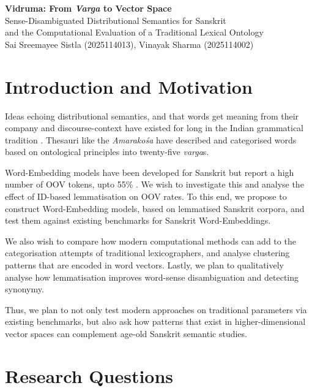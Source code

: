 \documentclass[11pt,a4paper]{article}
\begin{document}
\begin{center}
{\large\bfseries Vidruma: From \textit{Varga} to Vector Space}\\[2pt]
{\normalsize Sense-Disambiguated Distributional Semantics for Sanskrit\\ and the Computational Evaluation of a Traditional Lexical Ontology}\\[3pt]
{\small Sai Sreemayee Sistla (2025114013), Vinayak Sharma (2025114002)}
\end{center}

\vspace{-4pt}

\section{Introduction and Motivation}

    Ideas echoing distributional semantics, and that words get meaning from their company and discourse-context have existed for long in the Indian grammatical tradition \cite{Harris} \cite{Firth} \cite{Bhartrhari} \cite{Anandavardhana} \cite{Matilal}.
    Thesauri like the \textit{Amarako\'sa} have described and categorised words based on ontological principles into twenty-five \textit{varga}s.

    Word-Embedding models have been developed for Sanskrit but report a high number of OOV tokens, upto 55\% \cite{Sandhan}.
    We wish to investigate this and analyse the effect of ID-based lemmatisation on OOV rates.
    To this end, we propose to construct Word-Embedding models, based on lemmatised Sanskrit corpora, and test them against existing benchmarks for Sanskrit Word-Embeddings.
    
    We also wish to compare how modern computational methods can add to the categorisation attempts of traditional lexicographers, and analyse clustering patterns that are encoded in word vectors.
    Lastly, we plan to qualitatively analyse how lemmatisation improves word-sense disambiguation and detecting synonymy.

    Thus, we plan to not only test modern approaches on traditional parameters via existing benchmarks, but also ask how patterns that exist in higher-dimensional vector spaces can complement age-old Sanskrit semantic studies.

\section{Research Questions}
\end{document}
